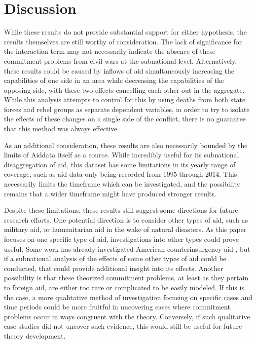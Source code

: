 \documentclass[12pt, letterpaper]{article}
\renewcommand{\cite}{\citep}
\begin{document}
\section{Discussion}

While these results do not provide substantial support for either hypothesis, the results themselves are still worthy of consideration. The lack of significance for the interaction term may not necessarily indicate the absence of these commitment problems from civil wars at the subnational level. Alternatively, these results could be caused by inflows of aid simultaneously increasing the capabilities of one side in an area while decreasing the capabilities of the opposing side, with these two effects cancelling each other out in the aggregate. While this analysis attempts to control for this by using deaths from both state forces and rebel groups as separate dependent variables, in order to try to isolate the effects of these changes on a single side of the conflict, there is no guarantee that this method was always effective. 

As an additional consideration, these results are also necessarily bounded by the limits of Aiddata itself as a source. While incredibly useful for its subnational disaggregation of aid, this dataset has some limitations in its yearly range of coverage, such as aid data only being recorded from 1995 through 2014. This necessarily limits the timeframe which can be investigated, and the possibility remains that a wider timeframe might have produced stronger results. 

Despite these limitations, these results still suggest some directions for future research efforts. One potential direction is to consider other types of aid, such as military aid, or humanitarian aid in the wake of natural disasters. As this paper focuses on one specific type of aid, investigations into other types could prove useful. Some work has already investigated American counterinsurgency aid \cite{berman2013modest, sexton2016aid}, but if a subnational analysis of the effects of some other types of aid could be conducted, that could provide additional insight into its effects. Another possibility is that these theorized commitment problems, at least as they pertain to foreign aid, are either too rare or complicated to be easily modeled. If this is the case, a more qualitative method of investigation focusing on specific cases and time periods could be more fruitful in uncovering cases where commitment problems occur in ways congruent with the theory. Conversely, if such qualitative case studies did not uncover such evidence, this would still be useful for future theory development. 
\end{document}
